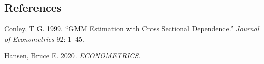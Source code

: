 \documentclass[
]{article}
\newlength{\cslhangindent}
\newenvironment{CSLReferences}[2] %
 {\begin{list}{}{%
  \setlength{\itemindent}{0pt}
  \setlength{\leftmargin}{0pt}
  \setlength{\parsep}{0pt}
  \ifodd #1
   \setlength{\leftmargin}{\cslhangindent}
   \setlength{\itemindent}{-1\cslhangindent}
  \fi
  \setlength{\itemsep}{#2\baselineskip}}}
 {\end{list}}
\begin{document}
\subsection*{References}\label{references}

\label{refs}
\begin{CSLReferences}{1}{0}
Conley, T G. 1999. {``GMM Estimation with Cross Sectional Dependence.''}
\emph{Journal of Econometrics} 92: 1--45.

Hansen, Bruce E. 2020. \emph{ECONOMETRICS}.

\end{CSLReferences}
\end{document}
